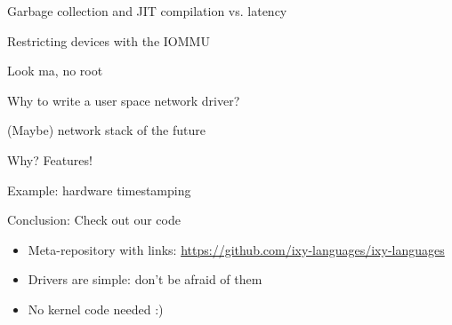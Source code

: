 \documentclass[NET,english,aspectratio=169,notitleframe,draft]{tumbeamer}
\begin{document}
\begin{frame}{Garbage collection and JIT compilation vs. latency}
\end{frame}


\begin{frame}{Restricting devices with the IOMMU}
\end{frame}

\begin{frame}{Look ma, no root}
\end{frame}


\begin{frame}{Why to write a user space network driver?}
\end{frame}

\begin{frame}{(Maybe) network stack of the future}
\end{frame}

\begin{frame}{Why? Features!}
\end{frame}

\begin{frame}{Example: hardware timestamping}
\end{frame}


\begin{frame}{Conclusion: Check out our code}
\centering {}
\begin{itemize}
\item Meta-repository with links: \url{https://github.com/ixy-languages/ixy-languages}
\item Drivers are simple: don't be afraid of them
\item No kernel code needed :)
\end{itemize}
\end{frame}
\end{document}
